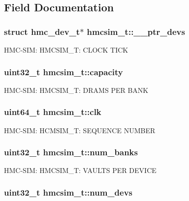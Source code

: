 \subsection{Field Documentation}
\hypertarget{structhmcsim__t_a53692f7358387116e3f506142d5c2029}{
\subsubsection[{\-\_\-\-\_\-ptr\-\_\-devs}]{\setlength{\rightskip}{0pt plus 5cm}struct {\bf hmc\-\_\-dev\-\_\-t}$\ast$ hmcsim\-\_\-t\-::\-\_\-\-\_\-ptr\-\_\-devs}}\label{structhmcsim__t_a53692f7358387116e3f506142d5c2029}
H\-M\-C-\/\-S\-I\-M\-: H\-M\-C\-S\-I\-M\-\_\-\-T\-: C\-L\-O\-C\-K T\-I\-C\-K \hypertarget{structhmcsim__t_a9471a6617d601750cdbd6db48487a66f}{
\subsubsection[{capacity}]{\setlength{\rightskip}{0pt plus 5cm}uint32\-\_\-t hmcsim\-\_\-t\-::capacity}}\label{structhmcsim__t_a9471a6617d601750cdbd6db48487a66f}
H\-M\-C-\/\-S\-I\-M\-: H\-M\-C\-S\-I\-M\-\_\-\-T\-: D\-R\-A\-M\-S P\-E\-R B\-A\-N\-K \hypertarget{structhmcsim__t_afbe3d57099fff20f474d2303fdd599cc}{
\subsubsection[{clk}]{\setlength{\rightskip}{0pt plus 5cm}uint64\-\_\-t hmcsim\-\_\-t\-::clk}}\label{structhmcsim__t_afbe3d57099fff20f474d2303fdd599cc}
H\-M\-C-\/\-S\-I\-M\-: H\-C\-M\-S\-I\-M\-\_\-\-T\-: S\-E\-Q\-U\-E\-N\-C\-E N\-U\-M\-B\-E\-R \hypertarget{structhmcsim__t_aeb143d0d648144e4daa22d96e395da5c}{
\subsubsection[{num\-\_\-banks}]{\setlength{\rightskip}{0pt plus 5cm}uint32\-\_\-t hmcsim\-\_\-t\-::num\-\_\-banks}}\label{structhmcsim__t_aeb143d0d648144e4daa22d96e395da5c}
H\-M\-C-\/\-S\-I\-M\-: H\-M\-C\-S\-I\-M\-\_\-\-T\-: V\-A\-U\-L\-T\-S P\-E\-R D\-E\-V\-I\-C\-E \hypertarget{structhmcsim__t_aa11e7edf3811b43bcb5e624d2b83dbf6}{
\subsubsection[{num\-\_\-devs}]{\setlength{\rightskip}{0pt plus 5cm}uint32\-\_\-t hmcsim\-\_\-t\-::num\-\_\-devs}}\label{structhmcsim__t_aa11e7edf3811b43bcb5e624d2b83dbf6}
